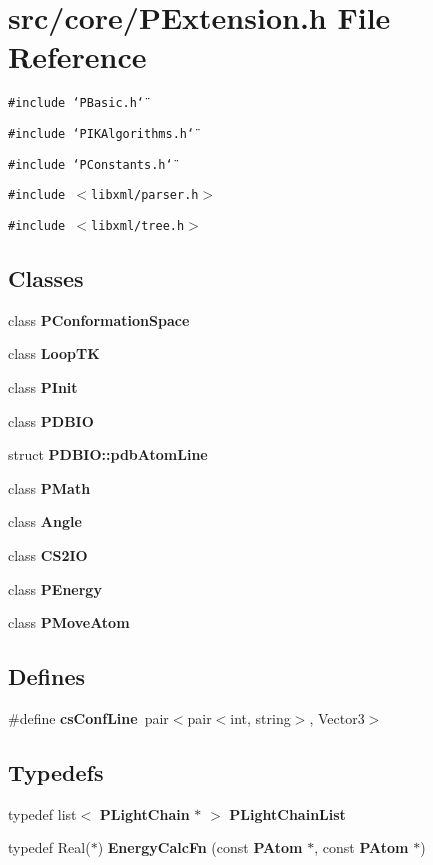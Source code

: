 \section{src/core/PExtension.h File Reference}
\label{PExtension_8h}


{\tt \#include \char`\"{}PBasic.h\char`\"{}}\par
{\tt \#include \char`\"{}PIKAlgorithms.h\char`\"{}}\par
{\tt \#include \char`\"{}PConstants.h\char`\"{}}\par
{\tt \#include $<$libxml/parser.h$>$}\par
{\tt \#include $<$libxml/tree.h$>$}\par
\subsection*{Classes}
\begin{CompactItemize}
\item 
class {\bf PConformation\-Space}
\item 
class {\bf Loop\-TK}
\item 
class {\bf PInit}
\item 
class {\bf PDBIO}
\item 
struct {\bf PDBIO::pdb\-Atom\-Line}
\item 
class {\bf PMath}
\item 
class {\bf Angle}
\item 
class {\bf CS2IO}
\item 
class {\bf PEnergy}
\item 
class {\bf PMove\-Atom}
\end{CompactItemize}
\subsection*{Defines}
\begin{CompactItemize}
\item 
\#define {\bf cs\-Conf\-Line}~pair$<$pair$<$int, string$>$, Vector3$>$
\end{CompactItemize}
\subsection*{Typedefs}
\begin{CompactItemize}
\item 
typedef list$<$ {\bf PLight\-Chain} $\ast$ $>$ {\bf PLight\-Chain\-List}
\item 
typedef Real($\ast$) {\bf Energy\-Calc\-Fn} (const {\bf PAtom} $\ast$, const {\bf PAtom} $\ast$)
\end{CompactItemize}
